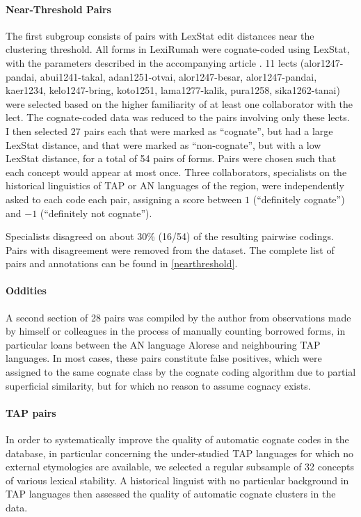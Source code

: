 \documentclass{scrartcl}
\begin{document}
\paragraph{Near-Threshold Pairs}
The first subgroup consists of pairs with LexStat edit distances near the clustering threshold.
All forms in LexiRumah were cognate-coded using LexStat, with the parameters described in the accompanying article \parencite{lexirumahpaper}.
11 lects
(alor1247-pandai,
abui1241-takal,
adan1251-otvai,
alor1247-besar,
alor1247-pandai,
kaer1234,
kelo1247-bring,
koto1251,
lama1277-kalik,
pura1258,
sika1262-tanai)
were selected based on the higher familiarity of at least one collaborator with the lect.
The cognate-coded data was reduced to the pairs involving only these lects. I then selected 27 pairs each that were marked as “cognate”, but had a large LexStat distance, and that were marked as “non-cognate”, but with a low LexStat distance, for a total of 54 pairs of forms. Pairs were chosen such that each concept would appear at most once.
Three collaborators, specialists on the historical linguistics of TAP or AN languages of the region, were independently asked to each code each pair, assigning a score between $1$ (“definitely cognate”) and $-1$ (“definitely not cognate”).

Specialists disagreed on about 30\% (16/54) of the resulting pairwise codings. Pairs with disagreement were removed from the dataset. The complete list of pairs and annotations can be found in \cref{nearthreshold}.

\paragraph{Oddities}
A second section of 28 pairs was compiled by the author from observations made by himself or colleagues in the process of manually counting borrowed forms, in particular loans between the AN language Alorese and neighbouring TAP languages. In most cases, these pairs constitute false positives, which were assigned to the same cognate class by the cognate coding algorithm due to partial superficial similarity, but for which no reason to assume cognacy exists.

\paragraph{TAP pairs}
In order to systematically improve the quality of automatic cognate codes in the database, in particular concerning the under-studied TAP languages for which no external etymologies are available, we selected a regular subsample of 32 concepts of various lexical stability. A historical linguist with no particular background in TAP languages then assessed the quality of automatic cognate clusters in the data.
\end{document}
